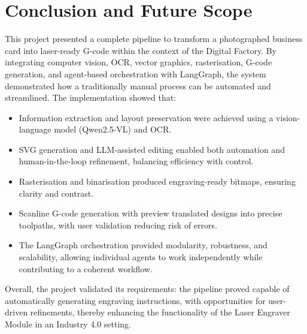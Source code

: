 \chapter{Conclusion and Future Scope}

This project presented a complete pipeline to transform a photographed business card into laser-ready G-code within the context of the Digital Factory. By integrating computer vision, OCR, vector graphics, rasterisation, G-code generation, and agent-based orchestration with LangGraph, the system demonstrated how a traditionally manual process can be automated and streamlined.
The implementation showed that:
\begin{itemize}
	\item Information extraction and layout preservation were achieved using a vision-language model (Qwen2.5-VL) and OCR.
\item SVG generation and LLM-assisted editing enabled both automation and human-in-the-loop refinement, balancing efficiency with control.
\item Rasterisation and binarisation produced engraving-ready bitmaps, ensuring clarity and contrast.
\item Scanline G-code generation with preview translated designs into precise toolpaths, with user validation reducing risk of errors.
\item The LangGraph orchestration provided modularity, robustness, and scalability, allowing individual agents to work independently while contributing to a coherent workflow.

\end{itemize}

Overall, the project validated its requirements: the pipeline proved capable of automatically generating engraving instructions, with opportunities for user-driven refinements, thereby enhancing the functionality of the Laser Engraver Module in an Industry 4.0 setting.


